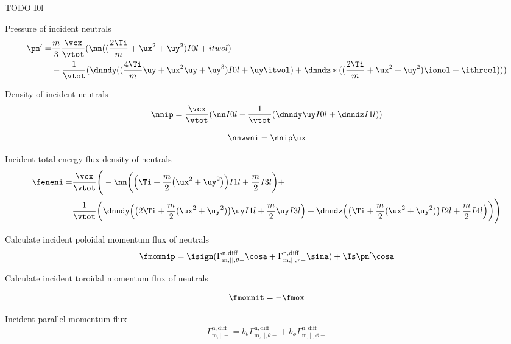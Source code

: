 TODO I0l

Pressure of incident neutrals
\begin{align}
          \pn'= & \frac{m}{3} \frac{\vcx}{\vtot} (\nn ((\frac{2 \Ti}{m} + \ux^2 +
          \uy^2) I0l + itwol)  \nonumber \\
          & - \frac{1}{\vtot} (\dnndy (( \frac{4 \Ti}{m} \uy +
          \ux^2 \uy + \uy^3) I0l + \uy \itwol) +
          \dnndz*((\frac{2 \Ti}{m} + \ux^2 + \uy^2) \ionel +
          \ithreel)))
\end{align}

Density of incident neutrals
\begin{equation}
          \nnip = \frac{\vcx}{\vtot} (\nn I0l -
          \frac{1}{\vtot} (\dnndy \uy I0l + \dnndz I1l))
\end{equation}

\begin{equation}
          \nnwwni = \nnip \ux
\end{equation}

Incident total energy flux density of neutrals
\begin{align}
          \feneni = & \frac{\vcx}{\vtot} \Bigg(-\nn \bigg( \Big( \Ti + \frac{m}{2}
          \big( \ux^2 + \uy^2 \big) \Big)
          I1l + \frac{m}{2} I3l \bigg) +  \nonumber \\
          & \frac{1}{\vtot} \bigg(\dnndy \Big( \big(2 \Ti +
          \frac{m}{2} (\ux^2 + \uy^2) \big) \uy I1l + \frac{m}{2} \uy I3l \Big) +
         \dnndz \Big( \big( \Ti + \frac{m}{2}(\ux^2 + \uy^2) \big) I2l +
         \frac{m}{2} I4l \Big) \bigg) \Bigg)
\end{align}

Calculate incident poloidal momentum flux of neutrals
\begin{equation}
\fmomnip = \isign(\Gamma_{\mathrm{m},||,\theta-}^{\mathrm{n,diff}} \cosa + \Gamma_{\mathrm{m},||,\tau-}^{\mathrm{n,diff}} \sina) + \Is \pn' \cosa
\end{equation}

Calculate incident toroidal momentum flux of neutrals

\begin{equation}
    \fmomnit = -\fmox
\end{equation}

Incident parallel momentum flux
\begin{equation}
    \Gamma_{\mathrm{m},||-}^{\mathrm{n,diff}} = b_\theta \Gamma_{\mathrm{m},||,\theta-}^{\mathrm{n,diff}} + b_\phi \Gamma_{\mathrm{m},||,\phi-}^{\mathrm{n,diff}}
\end{equation}

